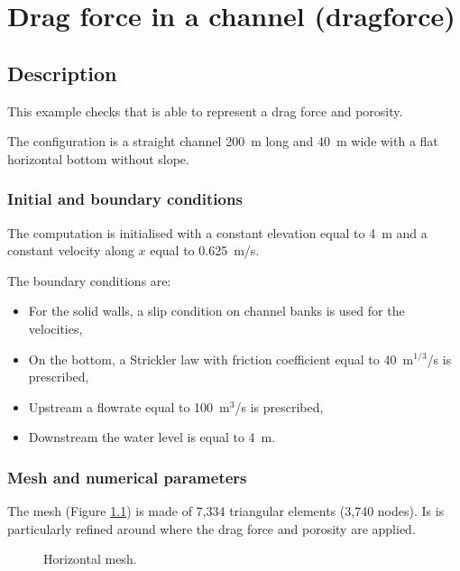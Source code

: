 \chapter{Drag force in a channel (dragforce)}

\section{Description}

This example checks that  is able to represent a drag force
and porosity.

The configuration is a straight channel 200~m long and 40~m wide
with a flat horizontal bottom without slope.

\subsection{Initial and boundary conditions}

The computation is initialised with a constant elevation equal to 4~m
and a constant velocity along $x$ equal to 0.625~m/s.

The boundary conditions are:
\begin{itemize}
\item For the solid walls, a slip condition on channel banks is used for the
velocities,
\item On the bottom, a Strickler law with friction coefficient equal to
40~m$^{1/3}$/s is prescribed,
\item Upstream a flowrate equal to 100~m$^3$/s is prescribed,
\item Downstream the water level is equal to 4~m.
\end{itemize}

\subsection{Mesh and numerical parameters}

The mesh (Figure \ref{t2d:dragforce:fig:meshH})
is made of 7,334 triangular elements (3,740 nodes).
Is is particularly refined around where the drag force and porosity are applied.

\begin{figure}[!htbp]
 \centering
 \caption{Horizontal mesh.}
 \label{t2d:dragforce:fig:meshH}
\end{figure}

